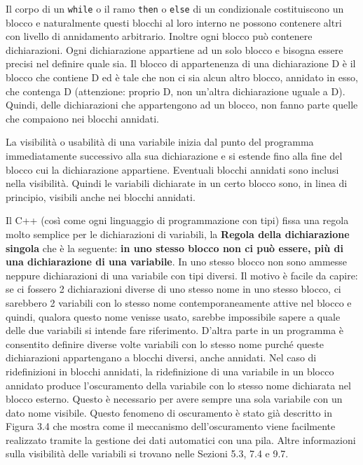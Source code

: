 \documentclass[a4paper,12pt]{book}
\begin{document}
Il corpo di un \texttt{while} o il ramo \texttt{then} o \texttt{else} di un condizionale costituiscono un blocco e naturalmente questi blocchi al loro interno ne possono contenere altri con livello di annidamento arbitrario.
Inoltre ogni blocco può contenere dichiarazioni.
Ogni dichiarazione appartiene ad un solo blocco e bisogna essere precisi nel definire quale sia.
Il blocco di appartenenza di una dichiarazione D è il blocco che contiene D ed è tale che non ci sia alcun altro blocco, annidato in esso, che contenga D (attenzione: proprio D, non un'altra dichiarazione uguale a D).
Quindi, delle dichiarazioni che appartengono ad un blocco, non fanno parte quelle che compaiono nei blocchi annidati. 

La visibilità o usabilità di una variabile inizia dal punto del programma immediatamente successivo alla sua dichiarazione e si estende fino alla fine del blocco cui la dichiarazione appartiene. Eventuali blocchi annidati sono inclusi nella visibilità. Quindi le variabili dichiarate in un certo blocco sono, in linea di principio, visibili anche nei blocchi annidati. 

Il C++ (così come ogni linguaggio di programmazione con tipi) fissa una regola molto semplice per le dichiarazioni di variabili, la \textbf{Regola della dichiarazione singola} che è la seguente: \textbf{in uno stesso blocco non ci può essere, più di una dichiarazione di una variabile}.
In uno stesso blocco non sono ammesse neppure dichiarazioni di una variabile con tipi diversi.
Il motivo è facile da capire: se ci fossero 2 dichiarazioni diverse di uno stesso nome in uno stesso blocco, ci sarebbero 2 variabili con lo stesso nome contemporaneamente attive nel blocco e quindi, qualora questo nome venisse usato, sarebbe impossibile sapere a quale delle due variabili si intende fare riferimento.
D'altra parte in un programma è consentito definire diverse volte variabili con lo stesso nome purché queste dichiarazioni appartengano a blocchi diversi, anche annidati.
Nel caso di ridefinizioni in blocchi annidati, la ridefinizione di una variabile in un blocco annidato produce l'oscuramento della variabile con lo stesso nome dichiarata nel blocco esterno.
Questo è necessario per avere sempre una sola variabile con un dato nome visibile.
Questo fenomeno di oscuramento è stato già descritto in Figura 3.4 che mostra come il meccanismo dell'oscuramento viene facilmente realizzato tramite la gestione dei dati automatici con una pila.
Altre informazioni sulla visibilità delle variabili si trovano nelle Sezioni 5.3, 7.4 e 9.7.
\end{document}
